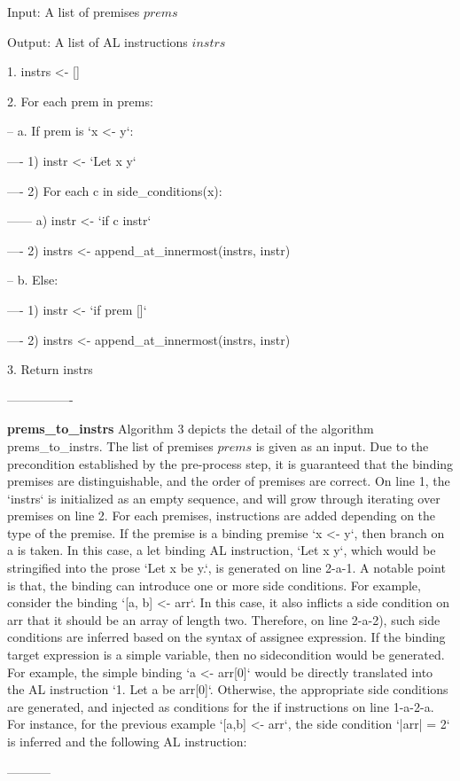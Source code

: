 Input: A list of premises $prems$

Output: A list of AL instructions $instrs$

1. instrs <- []

2. For each prem in prems:

-- a. If prem is `x <- y`:

---- 1) instr <- `Let x y`

---- 2) For each c in side\_conditions(x):

------ a) instr <- `if c instr`

---- 2) instrs <- append\_at\_innermost(instrs, instr)

-- b. Else:

---- 1) instr <- `if prem []`

---- 2) instrs <- append\_at\_innermost(instrs, instr)

3. Return instrs

----------------

\textbf{prems\_to\_instrs} Algorithm 3 depicts the detail of the algorithm prems\_to\_instrs.
The list of premises $prems$ is given as an input. Due to the precondition established by the pre-process step,
it is guaranteed that the binding premises are distinguishable, and the order of premises are correct.
On line 1, the `instrs` is initialized as an empty sequence, and will grow through iterating over premises
on line 2. For each premises, instructions are added depending on the type of the premise.
If the premise is a binding premise `x <- y`, then branch on a is taken.
In this case, a let binding AL instruction, `Let x y`, which would be stringified into the prose
`Let x be y.`, is generated on line 2-a-1. A notable point is that,
the binding can introduce one or more side conditions. For example, consider the binding `[a, b] <- arr`.
In this case, it also inflicts a side condition on arr that it should be an array of length two. Therefore,
on line 2-a-2), such side conditions are inferred based on the syntax of assignee expression.
If the binding target expression is a simple variable, then no sidecondition would be generated.
For example, the simple binding `a <- arr[0]` would be directly translated into the AL instruction
`1. Let a be arr[0]`.
Otherwise, the appropriate side conditions are generated,
and injected as conditions for the if instructions on line 1-a-2-a.
For instance, for the previous example `[a,b] <- arr`,
the side condition `|arr| = 2` is inferred and
the following AL instruction:

-----------

